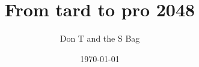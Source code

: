 \documentclass[article, oneside, a4paper]{memoir}
\title{From tard to pro \@ 2048}
\author{Don T and the S Bag}
\date{\today}
\begin{document}
\frontmatter
\maketitle

\tableofcontents*
\clearpage

\mainmatter





\end{document}
